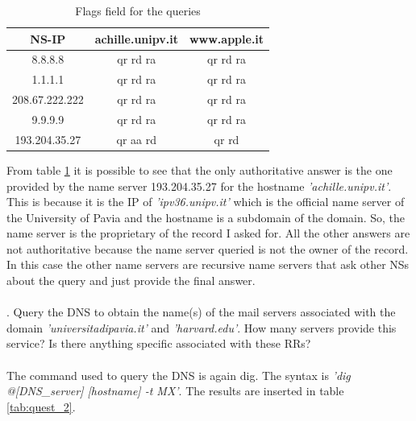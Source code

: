 \documentclass[a4paper,10pt]{article}
\begin{document}
\begin{multicols}{2}
        \begin{table}[H]
                \centering
                \caption{\small Flags field for the queries}
                \vspace{0.3cm}
                \begin{tabular}{|c|c|c|}
                \hline
                \textbf{NS-IP} & \textbf{achille.unipv.it} & \textbf{www.apple.it} \\ \hline
                {8.8.8.8} & qr rd ra & qr rd ra \\ \hline
                {1.1.1.1} & qr rd ra & qr rd ra \\ \hline
                {208.67.222.222} & qr rd ra & qr rd ra \\ \hline
                {9.9.9.9} & qr rd ra & qr rd ra \\ \hline
                {193.204.35.27} & \cellcolor{cyan} qr aa rd & qr rd \\ \hline
                \end{tabular}
                \label{tab:quest_1}
        \end{table}
\noindent
From table \ref{tab:quest_1} it is possible to see that the only authoritative answer is the one provided by the name server 193.204.35.27 for the hostname
\textit{'achille.unipv.it'}. This is because it is the IP of \textit{'ipv36.unipv.it'} which is the official name server of the University of Pavia and the hostname is a subdomain of the domain.
So, the name server is the proprietary of the record I asked for. All the other answers are not authoritative because the name server queried is not the owner of the record. 
In this case the other name servers are recursive name servers that ask other NSs about the query and just provide the final answer.\\
\\
. Query the DNS to obtain the name(s) of the mail servers associated with the domain \textit{'universitadipavia.it'} and \textit{'harvard.edu'}. How many servers provide this service? Is there anything 
specific associated with these RRs?\\
\\
The command used to query the DNS is again dig. The syntax is \textit{'dig @[DNS\_server] [hostname] -t MX'}. The results are inserted in table \ref{tab:quest_2}.


\end{multicols}
\end{document}
